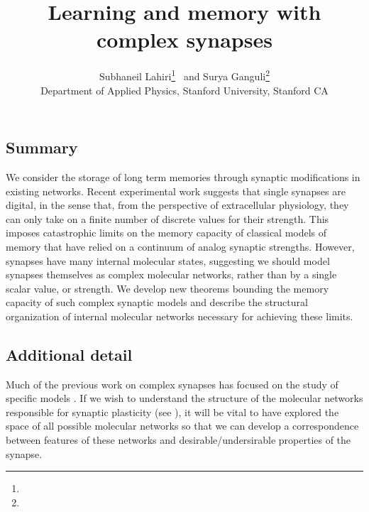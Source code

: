 \documentclass[12pt]{article}
\title{Learning and memory with complex synapses}
\author{Subhaneil Lahiri\thanks{\emaillink{sulahiri@stanford.edu}}~ and Surya Ganguli\thanks{\emaillink{sganguli@stanford.edu}}\\
%
\small{
Department of Applied Physics, Stanford University, Stanford CA
}
}
\begin{document}
\maketitle




\subsection*{Summary}

We consider the storage of long term memories through synaptic modifications in existing networks. 
Recent experimental work suggests that single synapses are digital, in the sense that, from the perspective of extracellular physiology, they can only take on a finite number of discrete values for their strength. 
This imposes catastrophic limits on the memory capacity of classical models of memory that have relied on a continuum of analog synaptic strengths. 
However, synapses have many internal molecular states, suggesting we should model synapses themselves as complex molecular networks, rather than by a single scalar value, or strength. 
We develop new theorems bounding the memory capacity of such complex synaptic models and describe the structural organization of internal molecular networks necessary for achieving these limits.

\subsection*{Additional detail}

Much of the previous work on complex synapses has focused on the study of specific models \cite{amit1994learning,Fusi2005cascade,Fusi2007multistate}.
If we wish to understand the structure of the molecular networks responsible for synaptic plasticity (see \cite{Coba2009phosphorylation}), it will be vital to have explored the space of all possible molecular networks so that we can develop a correspondence between features of these networks and desirable/undersirable properties of the synapse.





\end{document}
